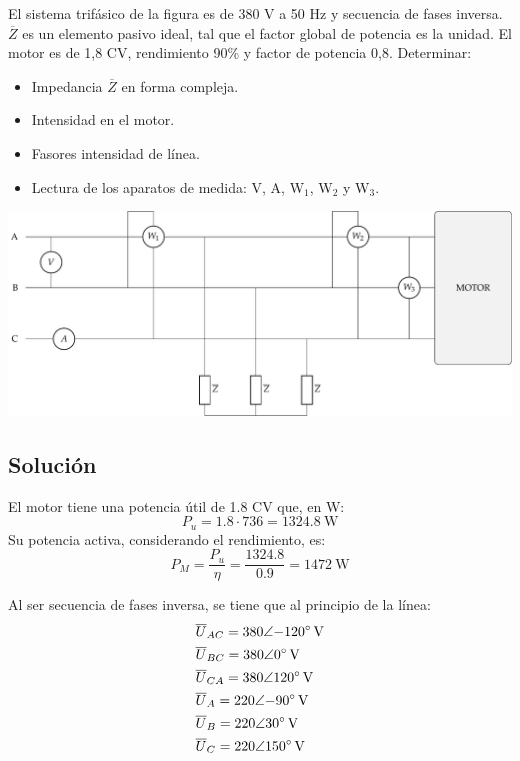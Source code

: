 El sistema trifásico de la figura es de 380 V a 50 Hz y secuencia de fases inversa. $\overline{Z}$ es un elemento pasivo ideal, tal que el factor global de potencia es la unidad. El motor es de 1,8 CV, rendimiento 90\% y factor de potencia 0,8. Determinar:
\begin{itemize}
    \item  Impedancia $\overline{Z}$ en forma compleja.
    \item  Intensidad en el motor.
    \item  Fasores intensidad de línea.
    \item  Lectura de los aparatos de medida: V, A, W$_1$, W$_2$ y W$_3$.
\end{itemize}
\begin{center}
  \includegraphics[width=\linewidth]{figuras/ej7_BT3.pdf}
\end{center}

\subsection*{Solución}
El motor tiene una potencia útil de 1.8 CV que, en W:
\begin{equation*}
  P_u=1.8\cdot 736= \qty{1324.8}{\watt}
\end{equation*}
Su potencia activa, considerando el rendimiento, es:
\begin{equation*}
  P_M=\dfrac{P_u}{\eta}=\dfrac{1324.8}{0.9}=\qty{1472}{\watt}
\end{equation*} 


Al ser secuencia de fases inversa, se tiene que al principio de la
línea:
\begin{align*}
  &\overline{U}_{AC}=\complexqty{380:-120}{\volt}\\
  &\overline{U}_{BC}=\complexqty{380:0}{\volt}\\
  &\overline{U}_{CA}=\complexqty{380:120}{\volt}\\
  &\overline{U}_A=\complexqty{220:-90}{\volt}\\
  &\overline{U}_B=\complexqty{220:30}{\volt}\\
  &\overline{U}_C=\complexqty{220:150}{\volt}
\end{align*}

